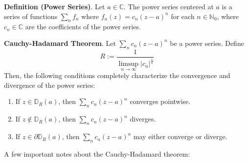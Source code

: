 \begin{framed}
\textbf{Definition (Power Series)}. Let $a\in\mathbb{C}$. The power series centered at $a$ is a series of functions $\sum_n f_n$ where $f_n(z) = c_n(z-a)^n$ for each $n\in\mathbb{N}_0$, where $c_n\in \mathbb{C}$ are the coefficients of the power series.

\textbf{Cauchy-Hadamard Theorem}. Let $\sum_n c_n(z-a)^n$ be a power series. Define \[R:=\frac{1}{\displaystyle\limsup_{n\to\infty} |c_n|^{\frac{1}{n}}}\] Then, the following conditions completely characterize the convergence and divergence of the power series: \vspace{-1em}\begin{enumerate}
    \item[1.] If $z\in\mathbb{D}_R(a)$, then $\sum_n c_n (z-a)^n$ converges pointwise.
    \item[2.] If $z\notin \mathbb{D}_R(a)$, then $\sum_n c_n(z-a)^n$ diverges.
    \item[3.] If $z\in \partial \mathbb{D}_R(a)$, then $\sum_n c_n(z-a)^n$ may either converge or diverge.
\end{enumerate}
\end{framed}
A few important notes about the Cauchy-Hadamard theorem:
\vspace{-1em}
